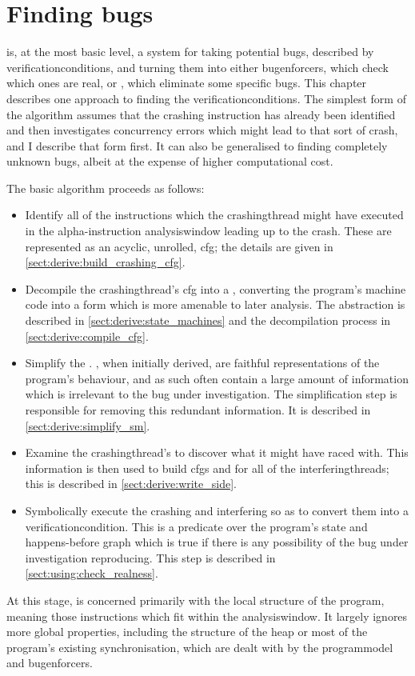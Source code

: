 \chapter{Finding bugs}
\label{sect:derive}

{\Technique} is, at the most basic level, a system for taking
potential bugs, described by \glspl{verificationcondition}, and
turning them into either \glspl{bugenforcer}, which check which ones
are real, or {\genfixes}, which eliminate some specific bugs.  This
chapter describes one approach to finding the
\glspl{verificationcondition}.  The simplest form of the algorithm
assumes that the crashing instruction has already been identified and
then investigates concurrency errors which might lead to that sort of
crash, and I describe that form first.  It can also be generalised to
finding completely unknown bugs, albeit at the expense of higher
computational cost.

The basic algorithm proceeds as follows:
\begin{itemize}
\item Identify all of the instructions which the \gls{crashingthread}
  might have executed in the \gls{alpha}-instruction
  \gls{analysiswindow} leading up to the crash.  These are represented
  as an acyclic, unrolled, \gls{cfg}; the details are given in
  \autoref{sect:derive:build_crashing_cfg}.
\item Decompile the \gls{crashingthread}'s \gls{cfg} into a
  {\StateMachine}, converting the program's machine code into a form
  which is more amenable to later analysis.  The {\StateMachine}
  abstraction is described in \autoref{sect:derive:state_machines} and
  the decompilation process in \autoref{sect:derive:compile_cfg}.
\item Simplify the {\StateMachine}.  {\STateMachines}, when initially
  derived, are faithful representations of the program's behaviour,
  and as such often contain a large amount of information which is
  irrelevant to the bug under investigation.  The simplification step
  is responsible for removing this redundant information.  It is
  described in \autoref{sect:derive:simplify_sm}.
\item Examine the \gls{crashingthread}'s {\StateMachine} to discover
  what it might have raced with.  This information is then used to
  build \glspl{cfg} and {\StateMachines} for all of the
  \glspl{interferingthread}; this is described in
  \autoref{sect:derive:write_side}.
\item Symbolically execute the crashing and interfering
  {\StateMachines} so as to convert them into a
  \gls{verificationcondition}.  This is a predicate over the program's
  state and happens-before graph which is true if there is any
  possibility of the bug under investigation reproducing.  This step
  is described in \autoref{sect:using:check_realness}.
\end{itemize}
At this stage, {\technique} is concerned primarily with the local
structure of the program, meaning those instructions which fit within
the \gls{analysiswindow}.  It largely ignores more global properties,
including the structure of the heap or most of the program's existing
synchronisation, which are dealt with by the \gls{programmodel} and
\glspl{bugenforcer}.

